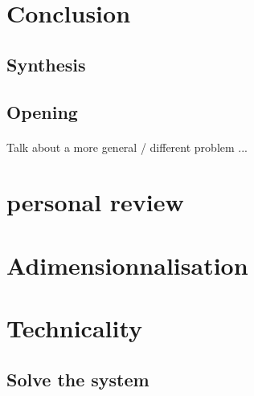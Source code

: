 \documentclass{article}
\begin{document}
\newpage

\section*{Conclusion}


\subsection*{Synthesis}


\subsection*{Opening}

\paragraph{}
Talk about a more general / different problem ...


\newpage

\section*{personal review}


\newpage





\newpage
\appendix
{}

\newpage
\section{Adimensionnalisation}



\newpage
\section{Technicality}

\subsection{Solve the system}
\end{document}
